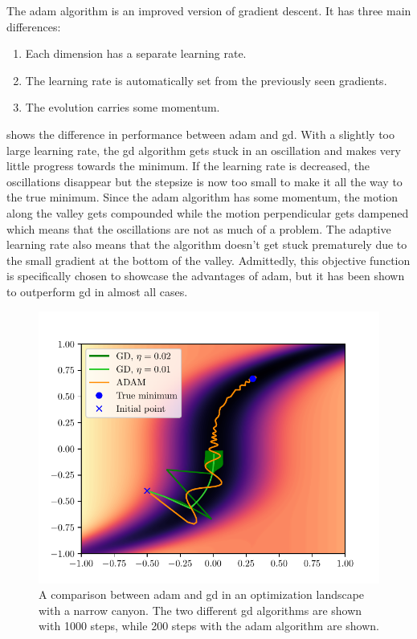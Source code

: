 The \gls{adam} algorithm is an improved version of gradient descent.
It has three main differences:
\begin{enumerate}
	\item Each dimension has a separate learning rate.
	\item The learning rate is automatically set from the previously seen gradients.
	\item The evolution carries some momentum.
\end{enumerate}
 shows the difference in performance between \gls{adam}
and \gls{gd}.
With a slightly too large learning rate, the \gls{gd} algorithm gets stuck in an
oscillation and makes very little progress towards the minimum.
If the learning rate is decreased, the oscillations disappear but the stepsize
is now too small to make it all the way to the true minimum. 
Since the \gls{adam} algorithm has some momentum, the motion along the valley
gets compounded while the motion perpendicular gets dampened which means that
the oscillations are not as much of a problem.
The adaptive learning rate also means that the algorithm doesn't get stuck
prematurely due to the small gradient at the bottom of the valley.
Admittedly, this objective function is specifically chosen to showcase the
advantages of \gls{adam}, but it has been shown to outperform \gls{gd} in almost
all cases.
\begin{figure}[htpb]
	\centering
	\includegraphics{chapters/theory/adam_vs_gd_plot.pdf}
	\caption{
		A comparison between \gls{adam} and \gls{gd} in an optimization
		landscape with a narrow canyon. The two different \gls{gd} algorithms
		are shown with 1000 steps, while 200 steps with the \gls{adam} algorithm
		are shown.
	}
	\label{fig:adam_vs_gd}
\end{figure}

